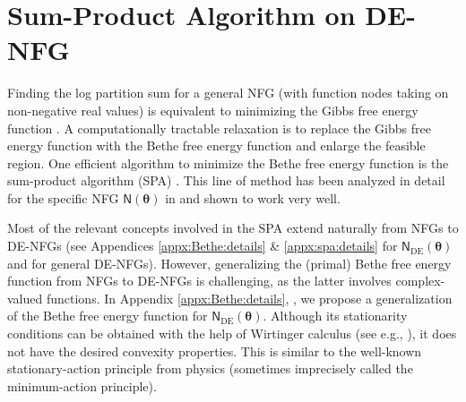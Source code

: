 \documentclass[conference]{IEEEtran}
\theoremstyle{plain}
\theoremstyle{definition}
\newcommand{\sfn}{\mathsf{N}}
\newcommand{\btheta}{\boldsymbol{\theta}}
\newcommand{\sfnDE}{\sfn_{\mathrm{DE}}}
\begin{document}

\section{Sum-Product Algorithm on DE-NFG}\label{sec:SPA}


Finding the log partition sum for a general NFG (with function nodes taking on
non-negative real values) is equivalent to minimizing the Gibbs free energy
function
\cite{yedidiaConstructingFreeenergyApproximations2005,wainwrightGraphicalModelsExponential2008}.
A computationally tractable relaxation is to replace the Gibbs free energy
function with the Bethe free energy function and enlarge the feasible region.
One efficient algorithm to minimize the Bethe free energy function is the
sum-product algorithm (SPA) \cite{kschischangFactorGraphsSumproduct2001}. This
line of method has been analyzed in detail for the specific NFG $\sfn(\btheta)$
in \cite{vontobelBethePermanentNonnegative2013} and shown to work very well.


Most of the relevant concepts involved in the SPA extend naturally from NFGs to
DE-NFGs (see \iflongversion Appendices \ref{appx:Bethe:details} \&
\ref{appx:spa:details} \else \cite{zhou2026} \fi for $\sfnDE(\btheta)$ and
\cite{huangGraphcoverbasedCharacterizationBethe2025} for general DE-NFGs).
However, generalizing the (primal) Bethe free energy function from NFGs to
DE-NFGs is challenging, as the latter involves complex-valued functions. In
\iflongversion Appendix \ref{appx:Bethe:details}, \else \cite{zhou2026}, \fi we
propose a generalization of the Bethe free energy function for
$\sfnDE(\btheta)$. Although its stationarity conditions can be obtained with
the help of Wirtinger calculus (see e.g.,
\cite{kreutz-delgadoComplexGradientOperator2009}), it does not have the desired
convexity properties. This is similar to the well-known stationary-action
principle from physics (sometimes imprecisely called the minimum-action
principle).

\end{document}
